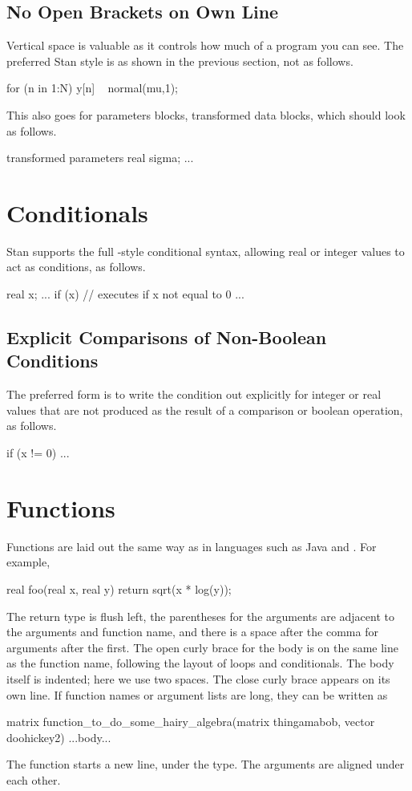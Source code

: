 \subsection{No Open Brackets on Own Line}

Vertical space is valuable as it controls how much of a program you
can see.  The preferred Stan style is as shown in the previous
section, not as follows.
%
\begin{stancode}
for (n in 1:N)
{
  y[n] ~ normal(mu,1);
}
\end{stancode}
%
This also goes for parameters blocks, transformed data blocks,
which should look as follows.
%
\begin{stancode}
transformed parameters {
  real sigma;
  ...
}
\end{stancode}
%


\section{Conditionals}

Stan supports the full \Cpp-style conditional syntax,
allowing real or integer values to act as conditions, as follows.
%
\begin{stancode}
real x;
...
if (x) {
   // executes if x not equal to 0
   ...
}
\end{stancode}
%

\subsection{Explicit Comparisons of Non-Boolean Conditions}

The preferred form is to write the condition out explicitly for
integer or real values that are not produced as the result of a
comparison or boolean operation, as follows.
%
\begin{stancode}
if (x != 0) ...
\end{stancode}


\section{Functions}

Functions are laid out the same way as in languages such as Java and
\Cpp.  For example,
%
\begin{stancode}
real foo(real x, real y) {
  return sqrt(x * log(y));
}
\end{stancode}
%
The return type is flush left, the parentheses for the arguments are
adjacent to the arguments and function name, and there is a space
after the comma for arguments after the first.  The open curly brace
for the body is on the same line as the function name, following the
layout of loops and conditionals.  The body itself is indented; here
we use two spaces.  The close curly brace appears on its own line.
%
If function names or argument lists are long, they can be
written as
%
\begin{stancode}
matrix
function_to_do_some_hairy_algebra(matrix thingamabob,
                                  vector doohickey2) {
  ...body...
}
\end{stancode}
%
The function starts a new line, under the type.  The arguments are
aligned under each other.


